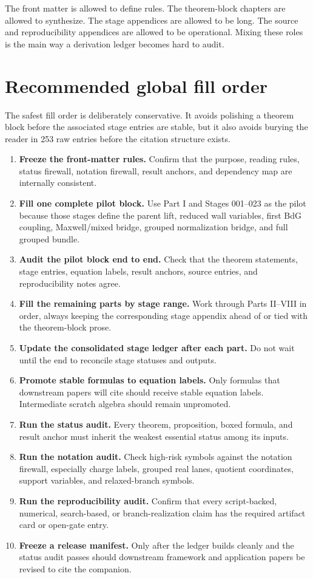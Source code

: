 The front matter is allowed to define rules.  The theorem-block chapters are allowed to synthesize.  The stage appendices are allowed to be long.  The source and reproducibility appendices are allowed to be operational.  Mixing these roles is the main way a derivation ledger becomes hard to audit.

\section{Recommended global fill order}
\label{sec:fill-global-order}

The safest fill order is deliberately conservative.  It avoids polishing a theorem block before the associated stage entries are stable, but it also avoids burying the reader in 253 raw entries before the citation structure exists.

\begin{enumerate}[leftmargin=2.5em]
\item \textbf{Freeze the front-matter rules.}  Confirm that the purpose, reading rules, status firewall, notation firewall, result anchors, and dependency map are internally consistent.
\item \textbf{Fill one complete pilot block.}  Use Part I and Stages 001--023 as the pilot because those stages define the parent lift, reduced wall variables, first BdG coupling, Maxwell/mixed bridge, grouped normalization bridge, and full grouped bundle.
\item \textbf{Audit the pilot block end to end.}  Check that the theorem statements, stage entries, equation labels, result anchors, source entries, and reproducibility notes agree.
\item \textbf{Fill the remaining parts by stage range.}  Work through Parts II--VIII in order, always keeping the corresponding stage appendix ahead of or tied with the theorem-block prose.
\item \textbf{Update the consolidated stage ledger after each part.}  Do not wait until the end to reconcile stage statuses and outputs.
\item \textbf{Promote stable formulas to equation labels.}  Only formulas that downstream papers will cite should receive stable equation labels.  Intermediate scratch algebra should remain unpromoted.
\item \textbf{Run the status audit.}  Every theorem, proposition, boxed formula, and result anchor must inherit the weakest essential status among its inputs.
\item \textbf{Run the notation audit.}  Check high-risk symbols against the notation firewall, especially charge labels, grouped real lanes, quotient coordinates, support variables, and relaxed-branch symbols.
\item \textbf{Run the reproducibility audit.}  Confirm that every script-backed, numerical, search-based, or branch-realization claim has the required artifact card or open-gate entry.
\item \textbf{Freeze a release manifest.}  Only after the ledger builds cleanly and the status audit passes should downstream framework and application papers be revised to cite the companion.
\end{enumerate}

